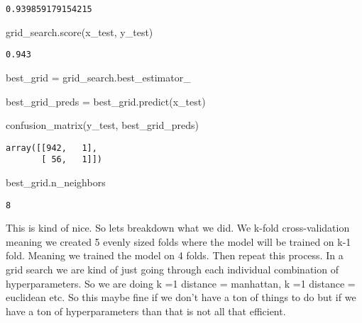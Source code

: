 \documentclass[
  letterpaper,
  DIV=11,
  numbers=noendperiod]{scrreprt}
\newenvironment{Shaded}{\begin{snugshade}}{\end{snugshade}}
\newcommand{\NormalTok}[1]{\textcolor[rgb]{0.00,0.23,0.31}{#1}}
\newcommand{\OperatorTok}[1]{\textcolor[rgb]{0.37,0.37,0.37}{#1}}
\begin{document}
\begin{verbatim}
0.939859179154215
\end{verbatim}

\begin{Shaded}
\begin{Highlighting}[]
\NormalTok{grid\_search.score(x\_test, y\_test)}
\end{Highlighting}
\end{Shaded}

\begin{verbatim}
0.943
\end{verbatim}

\begin{Shaded}
\begin{Highlighting}[]
\NormalTok{best\_grid }\OperatorTok{=}\NormalTok{ grid\_search.best\_estimator\_}


\NormalTok{best\_grid\_preds }\OperatorTok{=}\NormalTok{ best\_grid.predict(x\_test)}

\NormalTok{confusion\_matrix(y\_test, best\_grid\_preds)}
\end{Highlighting}
\end{Shaded}

\begin{verbatim}
array([[942,   1],
       [ 56,   1]])
\end{verbatim}

\begin{Shaded}
\begin{Highlighting}[]
\NormalTok{best\_grid.n\_neighbors}
\end{Highlighting}
\end{Shaded}

\begin{verbatim}
8
\end{verbatim}

This is kind of nice. So lets breakdown what we did. We k-fold
cross-validation meaning we created 5 evenly sized folds where the model
will be trained on k-1 fold. Meaning we trained the model on 4 folds.
Then repeat this process. In a grid search we are kind of just going
through each individual combination of hyperparameters. So we are doing
k =1 distance = manhattan, k =1 distance = euclidean etc. So this maybe
fine if we don't have a ton of things to do but if we have a ton of
hyperparameters than that is not all that efficient.
\end{document}

